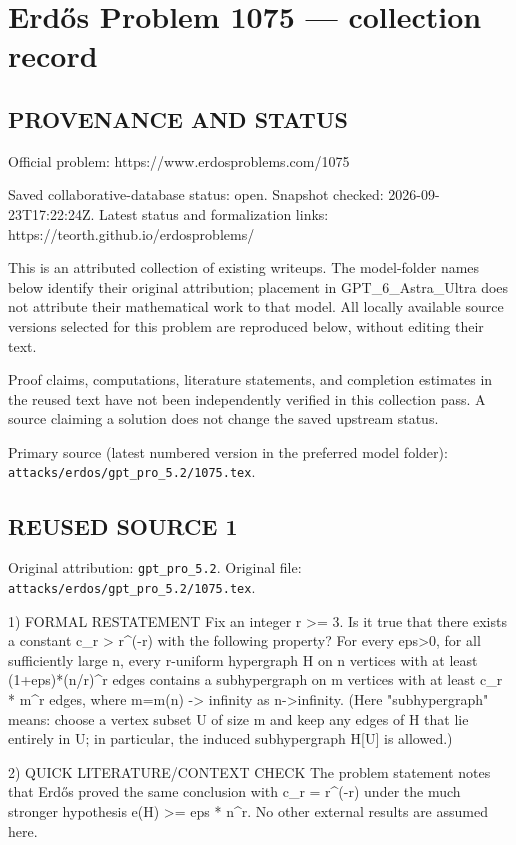 \section*{Erd\H{o}s Problem 1075 --- collection record}

\subsection*{PROVENANCE AND STATUS}
Official problem: https://www.erdosproblems.com/1075

Saved collaborative-database status: open.
Snapshot checked: 2026-09-23T17:22:24Z.
Latest status and formalization links: https://teorth.github.io/erdosproblems/

This is an attributed collection of existing writeups. The model-folder names below identify their original attribution; placement in GPT\_6\_Astra\_Ultra does not attribute their mathematical work to that model. All locally available source versions selected for this problem are reproduced below, without editing their text.

Proof claims, computations, literature statements, and completion estimates in the reused text have not been independently verified in this collection pass. A source claiming a solution does not change the saved upstream status.

Primary source (latest numbered version in the preferred model folder): \texttt{attacks/erdos/gpt\_pro\_5.2/1075.tex}.

\subsection*{REUSED SOURCE 1}
Original attribution: \texttt{gpt\_pro\_5.2}.
Original file: \texttt{attacks/erdos/gpt\_pro\_5.2/1075.tex}.


1) FORMAL RESTATEMENT
Fix an integer r >= 3.
Is it true that there exists a constant c_r > r^(-r) with the following property?
For every eps>0, for all sufficiently large n, every r-uniform hypergraph H on n vertices with at least (1+eps)*(n/r)^r edges contains a subhypergraph on m vertices with at least c_r * m^r edges, where m=m(n) -> infinity as n->infinity.
(Here "subhypergraph" means: choose a vertex subset U of size m and keep any edges of H that lie entirely in U; in particular, the induced subhypergraph H[U] is allowed.)

2) QUICK LITERATURE/CONTEXT CHECK
The problem statement notes that Erdős proved the same conclusion with c_r = r^(-r) under the much stronger hypothesis e(H) >= eps * n^r.
No other external results are assumed here.

